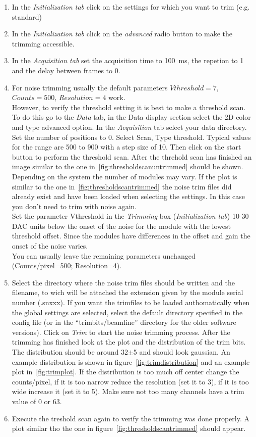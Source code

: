\begin{enumerate}
\item In the \textit{Initialization tab} click on the settings for which you want to trim (e.g. standard)
\item In the \textit{Initialization tab} click on the \textit{advanced} radio button to make the trimming accessible.
\item  In the \textit{Acquisition tab} set the acquisition time to 100~ms, the repetion to 1 and the delay between frames to 0.
\item For noise trimming usually the default parameters $Vthreshold=7$, $Counts=500$, $Resolution=4$ work.\\
However, to verify the threshold setting it is best to make a threshold scan. To do this go to the \textit{Data} tab, in the Data display section select the 2D color and type advanced option. In the \textit{Acquisition} tab select your data directory. Set the number of positions to 0. Select Scan, Type threshold. Typical values for the range are 500 to 900 with a step size of 10. Then click on the start button to perform the threshold scan. After the threhold scan has finished an image similar to the one in~\ref{fig:thresholdscanuntrimmed} should be shown. Depending on the system the number of modules may vary. If the plot is similar to the one in~\ref{fig:thresholdscantrimmed} the noise trim files did already exist and have been loaded when selecting the settings. In this case you don't need to trim with noise again.\\
Set the parameter Vthreshold in the \textit{Trimming} box (\textit{Initialization tab}) 10-30 DAC units below the onset of the noise for the module with the lowest threshold offset. Since the modules have differences in the offset and gain the onset of the noise varies. \\
You can usually leave the remaining parameters unchanged (Counts/pixel=500; Resolution=4).
\item Select the directory where the noise trim files should be written and the filename, to wich will be attached the extension given by the module serial number (.snxxx). If you want the trimfiles to be loaded authomatically when the global settings are selected, select the default directory specified in the config file (or in the ``trimbits/beamline'' directory for the older software versions). 
Click on \textit{Trim} to start the noise trimming process. After the trimming has finished look at the plot and the distribution of the trim bits. The distribution should be around 32$\pm$5 and should look gaussian. An example distribution is shown in figure~\ref{fig:trimdistribution} and an example plot in~\ref{fig:trimplot}. If the distribution is too much off center change the counts/pixel, if it is too narrow reduce the resolution (set it to 3), if it is too wide increase it (set it to 5). Make sure not too many channels have a trim value of 0 or 63.
\item Execute the treshold scan again to verify the trimming was done properly. A plot similar tho the one in figure~\ref{fig:thresholdscantrimmed} should appear.
\end{enumerate}

